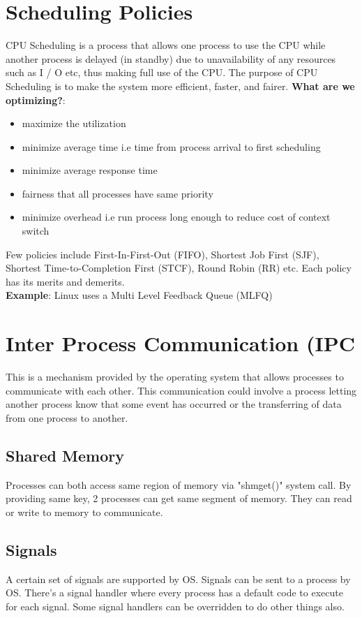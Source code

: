 \documentclass{article}
\begin{document}
\section{Scheduling Policies}
CPU Scheduling is a process that allows one process to use the CPU while another process is delayed (in standby) due to unavailability of any resources such as I / O etc, thus making full use of the CPU. The purpose of CPU Scheduling is to make the system more efficient, faster, and fairer.
\textbf{What are we optimizing?}: \\
\begin{itemize}
    \item maximize the utilization 
    \item minimize average time i.e time from process arrival to first scheduling
    \item minimize average response time
    \item fairness that all processes have same priority
    \item minimize overhead i.e run process long enough to reduce cost of context switch
\end{itemize}

Few policies include First-In-First-Out (FIFO), Shortest Job First (SJF), Shortest Time-to-Completion First (STCF), Round Robin (RR) etc. Each policy has its merits and demerits. \\
\textbf{Example}: Linux uses a Multi Level Feedback Queue (MLFQ)

\section{Inter Process Communication (IPC}
This is a mechanism provided by the operating system that allows processes to communicate with each other. This communication could involve a process letting another process know that some event has occurred or the transferring of data from one process to another.
\subsection{Shared Memory}
Processes can both access same region of memory via "shmget()" system call. By providing same key, 2 processes can get same segment of memory. They can read or write to memory to communicate.
\subsection{Signals}
A certain set of signals are supported by OS. Signals can be sent to a process by OS. There's a signal handler where every process has a default code to execute for each signal. Some signal handlers can be overridden to do other things also.
\end{document}
